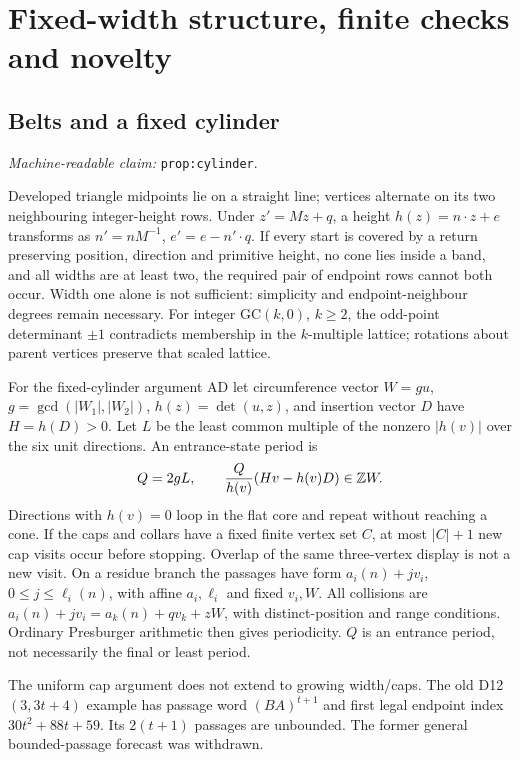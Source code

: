 \documentclass[11pt]{amsart}
\newcommand{\Z}{\mathbb Z}
\newcommand{\record}[1]{\nolinkurl{#1}}
\newcommand{\claimid}[1]{\par\nopagebreak\noindent\textit{Machine-readable claim:} \record{#1}.\par}
\theoremstyle{definition}\newtheorem{definition}{Definition}
\begin{document}
\section{Fixed-width structure, finite checks and novelty}\label{sec:evidence}
\subsection{Belts and a fixed cylinder}\label{prop:cylinder}
\claimid{prop:cylinder}
Developed triangle midpoints lie on a straight line; vertices alternate
on its two neighbouring integer-height rows. Under $z'=Mz+q$, a height
$h(z)=n\cdot z+e$ transforms as $n'=nM^{-1}$,
$e'=e-n'\cdot q$. If every start is covered by a return preserving
position, direction and primitive height, no cone lies inside a band,
and all widths are at least two, the required pair of endpoint rows
cannot both occur. Width one alone is not sufficient: simplicity and
endpoint-neighbour degrees remain necessary. For integer GC$(k,0)$,
$k\ge2$, the odd-point determinant $\pm1$ contradicts membership in
the $k$-multiple lattice; rotations about parent vertices preserve that
scaled lattice.

For the fixed-cylinder argument AD let circumference vector $W=gu$,
$g=\gcd(|W_1|,|W_2|)$, $h(z)=\det(u,z)$, and insertion vector $D$
have $H=h(D)>0$. Let $L$ be the least common multiple of the nonzero
$|h(v)|$ over the six unit directions. An entrance-state period is
\begin{equation}\label{eq:cylinder}
 Q=2gL,\qquad {Q\over h(v)}(Hv-h(v)D)\in\Z W.
\end{equation}
Directions with $h(v)=0$ loop in the flat core and repeat without
reaching a cone. If the caps and collars have a fixed finite vertex
set $C$, at most $|C|+1$ new cap visits occur before stopping. Overlap
of the same three-vertex display is not a new visit. On a residue
branch the passages have form $a_i(n)+jv_i$, $0\le j\le\ell_i(n)$,
with affine $a_i,\ell_i$ and fixed $v_i,W$. All collisions are
$a_i(n)+jv_i=a_k(n)+qv_k+zW$, with distinct-position and range
conditions. Ordinary Presburger arithmetic then gives periodicity.
$Q$ is an entrance period, not necessarily the final or least period.

The uniform cap argument does not extend to growing width/caps.
The old D12$(3,3t+4)$ example has passage word $(BA)^{t+1}$ and first
legal endpoint index $30t^2+88t+59$. Its $2(t+1)$ passages are unbounded.
The former general bounded-passage forecast was withdrawn.
\end{document}
